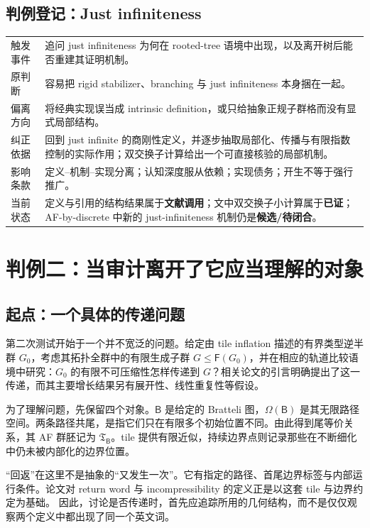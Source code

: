 \documentclass[UTF8,zihao=-4,fontset=none,oneside,openany]{ctexbook}
\newcommand{\BB}{\mathsf B}
\newcommand{\TT}{\mathfrak T_{\BB}}
\newcommand{\FF}{\mathsf F}
\begin{document}
\subsection*{判例登记：Just infiniteness}
\begin{tabularx}{\textwidth}{@{}p{30mm}X@{}}
\toprule
触发事件 & 追问 just infiniteness 为何在 rooted-tree 语境中出现，以及离开树后能否重建其证明机制。\\
原判断 & 容易把 rigid stabilizer、branching 与 just infiniteness 本身捆在一起。\\
偏离方向 & 将经典实现误当成 intrinsic definition，或只给抽象正规子群格而没有显式局部结构。\\
纠正依据 & 回到 just infinite 的商刚性定义，并逐步抽取局部化、传播与有限指数控制的实际作用；双交换子计算给出一个可直接核验的局部机制。\\
影响条款 & 定义--机制--实现分离；认知深度服从依赖；实现债务；开生不等于强行推广。\\
当前状态 & 定义与引用的结构结果属于\textbf{文献调用}；文中双交换子小计算属于\textbf{已证}；AF-by-discrete 中新的 just-infiniteness 机制仍是\textbf{候选/待闭合}。\\
\bottomrule
\end{tabularx}


\clearpage
\section{判例二：当审计离开了它应当理解的对象}
\label{sec:oe}
\subsection*{起点：一个具体的传递问题}
第二次测试开始于一个并不宽泛的问题。给定由 tile inflation 描述的有界类型逆半群 $G_0$，考虑其拓扑全群中的有限生成子群 $G\leq\FF(G_0)$，并在相应的轨道比较语境中研究：$G_0$ 的有限不可压缩性怎样传递到 $G$？相关论文的引言明确提出了这一传递，而其主要增长结果另有展开性、线性重复性等假设。\cite[Introduction, Section~4]{kua25}

为了理解问题，先保留四个对象。$\BB$ 是给定的 Bratteli 图，$\Omega(\BB)$ 是其无限路径空间。两条路径共尾，是指它们只在有限多个初始位置不同。由此得到尾等价关系，其 AF 群胚记为 $\TT$。tile 提供有限近似，持续边界点则记录那些在不断细化中仍未被内部化的边界位置。

“回返”在这里不是抽象的“又发生一次”。它有指定的路径、首尾边界标签与内部运行条件。论文对 return word 与 incompressibility 的定义正是以这套 tile 与边界约定为基础。\cite[Definitions~2.17--2.18]{kua25} 因此，讨论是否传递时，首先应追踪所用的几何结构，而不是仅仅观察两个定义中都出现了同一个英文词。
\end{document}
